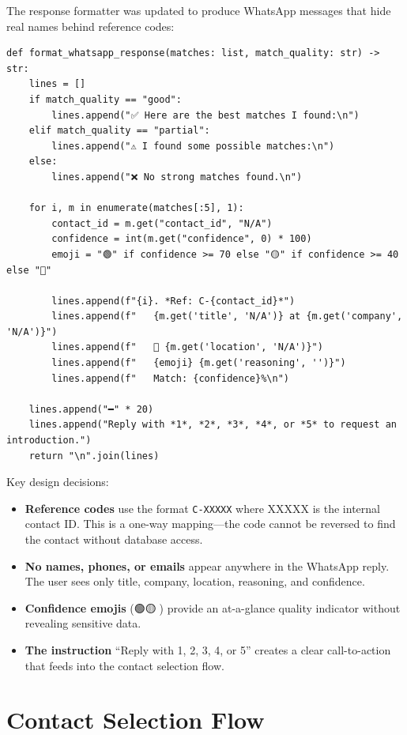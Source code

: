 \documentclass[12pt, a4paper]{report}
\begin{document}
The response formatter was updated to produce WhatsApp messages that hide real names behind reference codes:

\begin{lstlisting}[style=pythonstyle, caption={Privacy-Safe Formatting}]
def format_whatsapp_response(matches: list, match_quality: str) -> str:
    lines = []
    if match_quality == "good":
        lines.append("✅ Here are the best matches I found:\n")
    elif match_quality == "partial":
        lines.append("⚠️ I found some possible matches:\n")
    else:
        lines.append("❌ No strong matches found.\n")

    for i, m in enumerate(matches[:5], 1):
        contact_id = m.get("contact_id", "N/A")
        confidence = int(m.get("confidence", 0) * 100)
        emoji = "🟢" if confidence >= 70 else "🟡" if confidence >= 40 else "🔴"

        lines.append(f"{i}. *Ref: C-{contact_id}*")
        lines.append(f"   {m.get('title', 'N/A')} at {m.get('company', 'N/A')}")
        lines.append(f"   📍 {m.get('location', 'N/A')}")
        lines.append(f"   {emoji} {m.get('reasoning', '')}")
        lines.append(f"   Match: {confidence}%\n")

    lines.append("━" * 20)
    lines.append("Reply with *1*, *2*, *3*, *4*, or *5* to request an introduction.")
    return "\n".join(lines)
\end{lstlisting}

Key design decisions:
\begin{itemize}[itemsep=3pt]
    \item \textbf{Reference codes} use the format \texttt{C-XXXXX} where XXXXX is the internal contact ID. This is a one-way mapping---the code cannot be reversed to find the contact without database access.
    \item \textbf{No names, phones, or emails} appear anywhere in the WhatsApp reply. The user sees only title, company, location, reasoning, and confidence.
    \item \textbf{Confidence emojis} (🟢🟡🔴) provide an at-a-glance quality indicator without revealing sensitive data.
    \item \textbf{The instruction} ``Reply with 1, 2, 3, 4, or 5'' creates a clear call-to-action that feeds into the contact selection flow.
\end{itemize}

\section{Contact Selection Flow}
\end{document}
